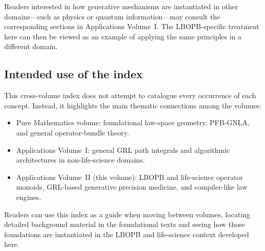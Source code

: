 \documentclass[11pt]{book}
\theoremstyle{plain}
\theoremstyle{definition}
\theoremstyle{remark}
\begin{document}
Readers interested in how generative mechanisms are instantiated in
other domains—such as physics or quantum information—may consult the
corresponding sections in Applications Volume~I. The LBOPB-specific
treatment here can then be viewed as an example of applying the same
principles in a different domain.

\subsection*{Intended use of the index}

This cross-volume index does not attempt to catalogue every occurrence
of each concept. Instead, it highlights the main thematic connections
among the volumes:

\begin{itemize}
  \item Pure Mathematics volume: foundational law-space geometry,
        PFB-GNLA, and general operator-bundle theory.
  \item Applications Volume~I: general GRL path integrals and
        algorithmic architectures in non-life-science domains.
  \item Applications Volume~II (this volume): LBOPB and life-science
        operator monoids, GRL-based generative precision medicine, and
        compiler-like law engines.
\end{itemize}

Readers can use this index as a guide when moving between volumes,
locating detailed background material in the foundational texts and
seeing how those foundations are instantiated in the LBOPB and
life-science context developed here.

\clearpage
\end{document}
